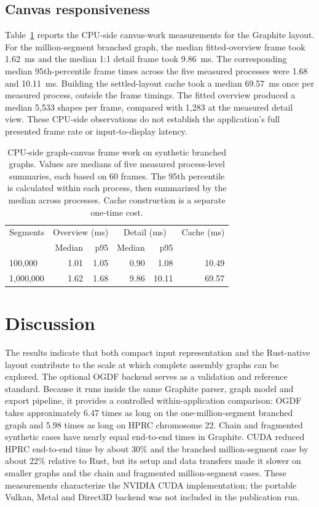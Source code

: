\documentclass[11pt]{article}
\begin{document}
\subsection{Canvas responsiveness}
Table~\ref{tab:canvas-work} reports the CPU-side canvas-work measurements for the Graphite layout. For the million-segment branched graph, the median fitted-overview frame took 1.62~ms and the median 1:1 detail frame took 9.86~ms. The corresponding median 95th-percentile frame times across the five measured processes were 1.68 and 10.11~ms. Building the settled-layout cache took a median 69.57~ms once per measured process, outside the frame timings. The fitted overview produced a median 5,533 shapes per frame, compared with 1,283 at the measured detail view. These CPU-side observations do not establish the application's full presented frame rate or input-to-display latency.

\begin{table}[ht]
\centering
\caption{CPU-side graph-canvas frame work on synthetic branched graphs. Values are medians of five measured process-level summaries, each based on 60 frames. The 95th percentile is calculated within each process, then summarized by the median across processes. Cache construction is a separate one-time cost.}
\label{tab:canvas-work}
\small
\begin{tabular}{lrrrrr}
\toprule
Segments & \multicolumn{2}{c}{Overview (ms)} & \multicolumn{2}{c}{Detail (ms)} & Cache (ms)\\
 & Median & p95 & Median & p95 & \\
\midrule
100,000 & 1.01 & 1.05 & 0.90 & 1.08 & 10.49\\
1,000,000 & 1.62 & 1.68 & 9.86 & 10.11 & 69.57\\
\bottomrule
\end{tabular}
\end{table}

\section{Discussion}
The results indicate that both compact input representation and the Rust-native layout contribute to the scale at which complete assembly graphs can be explored. The optional OGDF backend serves as a validation and reference standard. Because it runs inside the same Graphite parser, graph model and export pipeline, it provides a controlled within-application comparison: OGDF takes approximately 6.47 times as long on the one-million-segment branched graph and 5.98 times as long on HPRC chromosome 22. Chain and fragmented synthetic cases have nearly equal end-to-end times in Graphite. CUDA reduced HPRC end-to-end time by about 30\% and the branched million-segment case by about 22\% relative to Rust, but its setup and data transfers made it slower on smaller graphs and the chain and fragmented million-segment cases. These measurements characterize the NVIDIA CUDA implementation; the portable Vulkan, Metal and Direct3D backend was not included in the publication run.
\end{document}
